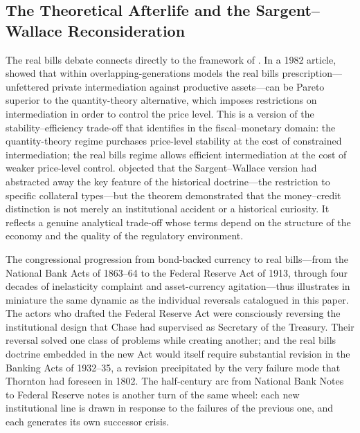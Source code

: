 \documentclass[12pt]{article}
\begin{document}
\subsection{The Theoretical Afterlife and the Sargent--Wallace
            Reconsideration}

The real bills debate connects directly to the framework of
\citet{Sargent2011}.  In a 1982 article, \citet{SargentWallace1982}
showed that within overlapping-generations models the real bills
prescription---unfettered private intermediation against productive
assets---can be Pareto superior to the quantity-theory alternative,
which imposes restrictions on intermediation in order to control the
price level.  This is a version of the stability--efficiency trade-off
that \citet{Sargent2011} identifies in the fiscal--monetary domain:
the quantity-theory regime purchases price-level stability at the cost
of constrained intermediation; the real bills regime allows efficient
intermediation at the cost of weaker price-level control.
\citet{Laidler1984} objected that the Sargent--Wallace version had
abstracted away the key feature of the historical doctrine---the
restriction to specific collateral types---but the theorem demonstrated
that the money--credit distinction is not merely an institutional
accident or a historical curiosity.  It reflects a genuine analytical
trade-off whose terms depend on the structure of the economy and the
quality of the regulatory environment.

The congressional progression from bond-backed currency to real
bills---from the National Bank Acts of 1863--64 to the Federal Reserve
Act of 1913, through four decades of inelasticity complaint and
asset-currency agitation---thus illustrates in miniature the same
dynamic as the individual reversals catalogued in this paper.  The
actors who drafted the Federal Reserve Act were consciously reversing
the institutional design that Chase had supervised as Secretary of the
Treasury.  Their reversal solved one class of problems while creating
another; and the real bills doctrine embedded in the new Act would
itself require substantial revision in the Banking Acts of 1932--35,
a revision precipitated by the very failure mode that Thornton had
foreseen in 1802.  The half-century arc from National Bank Notes to
Federal Reserve notes is another turn of the same wheel: each new
institutional line is drawn in response to the failures of the previous
one, and each generates its own successor crisis.

\end{document}
